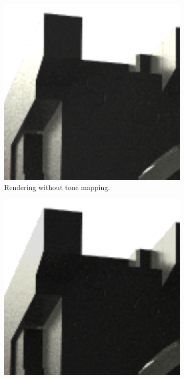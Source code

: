 \begin{figure}[H]
  \centering
  \hspace*{2cm}
  \begin{subfigure}[t]{0.3\textwidth}
    \includegraphics[width=\textwidth]{resources/tonemapping-none.png}
    \caption{Rendering without tone mapping.}
    \label{fig:tone-mapping-none}
  \end{subfigure}
  \hfill
  \begin{subfigure}[t]{0.3\textwidth}
    \includegraphics[width=\textwidth]{resources/tonemapping-khronos-pbr-neutraltone.png}

\end{subfigure}
\end{figure}
